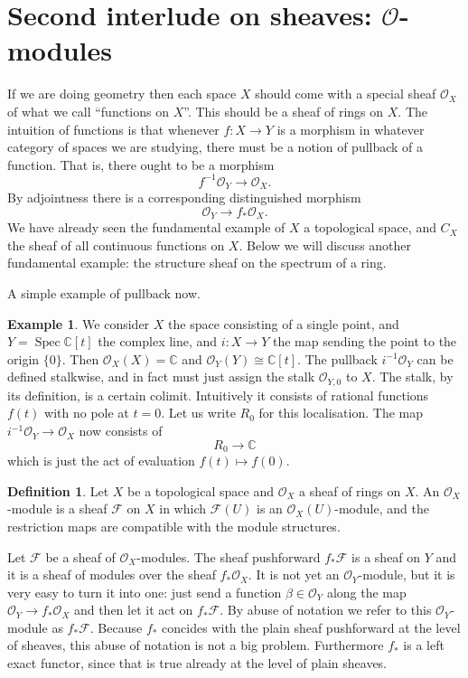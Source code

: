 \documentclass[12pt]{article}
\theoremstyle{plain}
\theoremstyle{definition}
\newtheorem{defn}{Definition}[section]
\newtheorem{exmp}{Example}%
\numberwithin{equation}{section}
\DeclareMathOperator{\spec}{Spec}
\newcommand{\C}{\mathbb{C}}
\newcommand{\CF}{\mathcal{F}}
\newcommand{\OO}{\mathcal{O}}
\begin{document}
\section{Second interlude on sheaves: $\OO$-modules}




If we are doing geometry then each space $X$ should come with a special sheaf $\OO_X$ of what we call ``functions on $X$''. This should be a sheaf of rings on $X$. The intuition of functions is that whenever $f : X \rightarrow Y$ is a morphism in whatever category of spaces we are studying, there must be a notion of pullback of a function. That is, there ought to be a morphism
\[
f^{-1}\OO_Y \rightarrow \OO_X.
\]
By adjointness there is a corresponding distinguished morphism
\[
\OO_Y \rightarrow f_* \OO_X.
\]
We have already seen the fundamental example of $X$ a topological space, and $C_X$ the sheaf of all continuous functions on $X$. Below we will discuss another fundamental example: the structure sheaf on the spectrum of a ring.



A simple example of pullback now.
\begin{exmp}
We consider $X$ the space consisting of a single point, and $Y = \spec \C[t]$ the complex line, and $i : X \rightarrow Y$ the map sending the point to the origin $\{0\}$. Then $\OO_X(X) = \C$ and $\OO_Y(Y) \cong \C[t]$. The pullback $i^{-1} \OO_Y$ can be defined stalkwise, and in fact must just assign the stalk $\OO_{Y, 0}$ to $X$. The stalk, by its definition, is a certain colimit. Intuitively it consists of rational functions $f(t)$ with no pole at $t=0$. Let us write $R_0$ for this localisation. The map $i^{-1} \OO_Y \rightarrow \OO_X$ now consists of
\[
R_0 \rightarrow \C
\]
which is just the act of evaluation $f(t) \mapsto f(0)$.
\end{exmp}

\begin{defn}
Let $X$ be a topological space and $\OO_X$ a sheaf of rings on $X$. An $\OO_X$-module is a sheaf $\CF$ on $X$ in which $\CF(U)$ is an $\OO_X(U)$-module, and the restriction maps are compatible with the module structures.
\end{defn}

Let $\CF$ be a sheaf of $\OO_X$-modules. The sheaf pushforward $f_*\CF$ is a sheaf on $Y$ and it is a sheaf of modules over the sheaf $f_*\OO_X$. It is not yet an $\OO_Y$-module, but it is very easy to turn it into one: just send a function $\beta \in \OO_Y$ along the map $\OO_Y \rightarrow f_* \OO_X$ and then let it act on $f_*\CF$. By abuse of notation we refer to this $\OO_Y$-module as $f_*\CF$. Because $f_*$ concides with the plain sheaf pushforward at the level of sheaves, this abuse of notation is not a big problem. Furthermore $f_*$ is a left exact functor, since that is true already at the level of plain sheaves.
\end{document}
